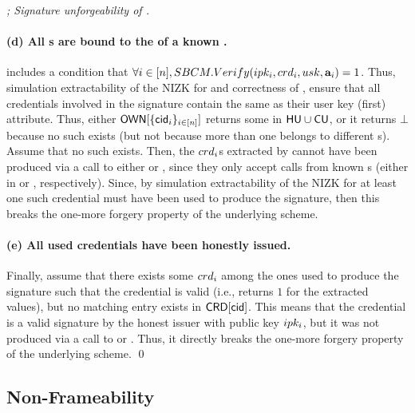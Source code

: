 \begin{proof}[; Signature unforgeability of \CUASGen]
  \paragraph{(d) All {\cred}s are bound to the \usk of a known \uid.} %
  \RelSig includes a condition that $\forall i\in[n], 
  SBCM.Verify(ipk_i,crd_i,usk,\mathbf{a}_i) = 1$. Thus, simulation
  extractability of the NIZK for \RelSig and correctness of \SBCM, ensure that
  all credentials involved in the signature contain the same \usk as their user
  key  (first) attribute. Thus, either $\mathsf{OWN}[\lbrace \mathsf{cid}_i \rbrace_{i\in[n]}]$
  returns some \uid in $\mathsf{HU} \cup \mathsf{CU}$, or it returns $\bot$ because no such
  \uid exists (but not because more than one \cid belongs to different {\uid}s).
  Assume that no such \uid exists. Then, the {$crd_i$}s extracted by
  \ExtractSign cannot have been produced via a call to either \OBTISS or \ISSUE,
  since they only accept calls from known {\uid}s (either in \HU or \CU,
  respectively). Since, by simulation extractability of the NIZK for \RelSig at
  least one such credential must have been used to produce the signature, then
  this breaks the one-more forgery property of the underlying \SBCM scheme.

  \paragraph{(e) All used credentials have been honestly issued.} %
  Finally, assume that there exists some $crd_i$ among the ones used to
  produce the signature such that the credential is valid (i.e., \VerCred
  returns $1$ for the extracted values), but no matching entry exists in
  $\mathsf{CRD}[\mathsf{cid}]$. This means that the credential is a valid signature by the
  honest issuer with public key $ipk_i$, but it was not produced via a call
  to \OBTISS or \ISSUE. Thus, it directly breaks the one-more forgery property
  of the underlying \SBCM scheme.
  \qed
\end{proof}

\subsection{Non-Frameability}

